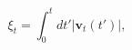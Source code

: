 \begin{equation}
\xi_t = \int_{0}^{t}{\mathit{dt'}|\mathbf{v}_t(\mathit{t'})|} ,
 \label{eq:xit}
\end{equation}
